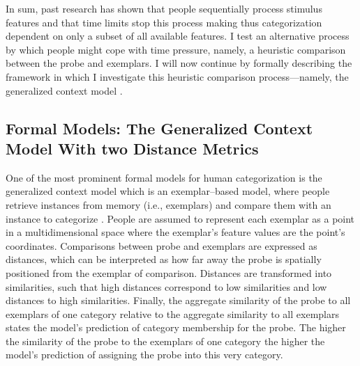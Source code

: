 \documentclass[a4paper,man,natbib]{apa6}
\begin{document}

In sum, past research has shown that people sequentially process stimulus features and that time limits stop this process making thus categorization dependent on only a subset of all available features. I test an alternative process by which people might cope with time pressure, namely, a heuristic comparison between the probe and exemplars. I will now continue by formally describing the framework in which I investigate this heuristic comparison process---namely, the generalized context model \citep{nosofsky1986attention}.

\subsection{Formal Models: The Generalized Context Model With two Distance Metrics}
One of the most prominent formal models for human categorization is the generalized context model \citep{nosofsky1984choice, nosofsky1986attention, nosofsky2011generalized} which is an exemplar--based model, where people retrieve instances from memory (i.e., exemplars) and compare them with an instance to categorize \citep[i.e., the probe;][]{medin1978context}. People are assumed to represent each exemplar as a point in a multidimensional space where the exemplar's feature values are the point's coordinates. Comparisons between probe and exemplars are expressed as distances, which can be interpreted as how far away the probe is spatially positioned from the exemplar of comparison. Distances are transformed into similarities, such that high distances correspond to low similarities and low distances to high similarities. Finally, the aggregate similarity of the probe to all exemplars of one category relative to the aggregate similarity to all exemplars states the model's prediction of category membership for the probe. The higher the similarity of the probe to the exemplars of one category the higher the model's prediction of assigning the probe into this very category. 
\end{document}
